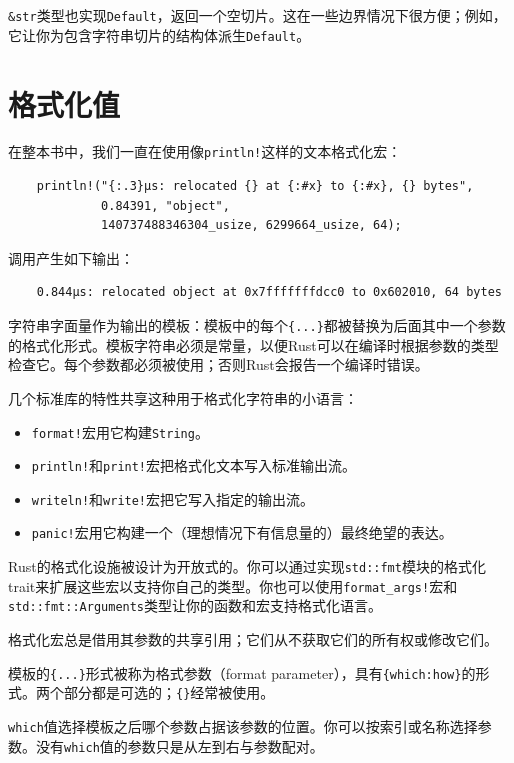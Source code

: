 \texttt{\&str}类型也实现\texttt{Default}，返回一个空切片。这在一些边界情况下很方便；例如，它让你为包含字符串切片的结构体派生\texttt{Default}。
\section{格式化值}\label{format}

在整本书中，我们一直在使用像\texttt{println!}这样的文本格式化宏：
\begin{verbatim}
    println!("{:.3}µs: relocated {} at {:#x} to {:#x}, {} bytes",
             0.84391, "object",
             140737488346304_usize, 6299664_usize, 64);
\end{verbatim}

调用产生如下输出：
\begin{verbatim}
    0.844µs: relocated object at 0x7fffffffdcc0 to 0x602010, 64 bytes
\end{verbatim}

字符串字面量作为输出的模板：模板中的每个\texttt{\{...\}}都被替换为后面其中一个参数的格式化形式。模板字符串必须是常量，以便Rust可以在编译时根据参数的类型检查它。每个参数都必须被使用；否则Rust会报告一个编译时错误。

几个标准库的特性共享这种用于格式化字符串的小语言：
\begin{itemize}
    \item \texttt{format!}宏用它构建\texttt{String}。
    \item \texttt{println!}和\texttt{print!}宏把格式化文本写入标准输出流。
    \item \texttt{writeln!}和\texttt{write!}宏把它写入指定的输出流。
    \item \texttt{panic!}宏用它构建一个（理想情况下有信息量的）最终绝望的表达。
\end{itemize}

Rust的格式化设施被设计为开放式的。你可以通过实现\texttt{std::fmt}模块的格式化trait来扩展这些宏以支持你自己的类型。你也可以使用\texttt{format\_args!}宏和\texttt{std::fmt::Arguments}类型让你的函数和宏支持格式化语言。

格式化宏总是借用其参数的共享引用；它们从不获取它们的所有权或修改它们。

模板的\texttt{\{...\}}形式被称为格式参数（format parameter），具有\texttt{\{which:how\}}的形式。两个部分都是可选的；\texttt{\{\}}经常被使用。

\texttt{which}值选择模板之后哪个参数占据该参数的位置。你可以按索引或名称选择参数。没有\texttt{which}值的参数只是从左到右与参数配对。

